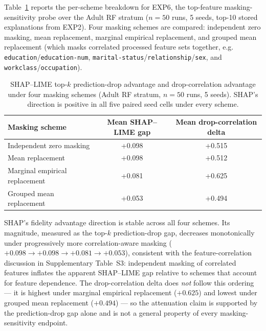 \documentclass[10pt]{article}
\begin{document}
Table~\ref{tab:s6_exp6} reports the per-scheme breakdown for EXP6, the
top-feature masking-sensitivity probe over the Adult RF stratum ($n=50$
runs, 5 seeds, top-10 stored explanations from EXP2). Four masking
schemes are compared: independent zero masking, mean replacement,
marginal empirical replacement, and grouped mean replacement (which masks
correlated processed feature sets together, e.g.
\texttt{education}/\texttt{education-num},
\texttt{marital-status}/\texttt{relationship}/\texttt{sex}, and
\texttt{workclass}/\texttt{occupation}).

\begin{table}[h]
\centering
\caption{SHAP--LIME top-$k$ prediction-drop advantage and drop-correlation
advantage under four masking schemes (Adult RF stratum, $n=50$ runs, 5
seeds). SHAP's direction is positive in all five paired seed cells under
every scheme.}
\label{tab:s6_exp6}
\begin{tabular}{lcc}
\toprule
Masking scheme & Mean SHAP--LIME gap & Mean drop-correlation delta \\
\midrule
Independent zero masking      & +0.098 & +0.515 \\
Mean replacement               & +0.098 & +0.512 \\
Marginal empirical replacement & +0.081 & +0.625 \\
Grouped mean replacement       & +0.053 & +0.494 \\
\bottomrule
\end{tabular}
\end{table}

\noindent SHAP's fidelity advantage direction is stable across all four
schemes. Its magnitude, measured as the top-$k$ prediction-drop gap,
decreases monotonically under progressively more correlation-aware
masking ($+0.098 \rightarrow +0.098 \rightarrow +0.081 \rightarrow
+0.053$), consistent with the feature-correlation discussion in
Supplementary Table~S3: independent masking of correlated features
inflates the apparent SHAP--LIME gap relative to schemes that account for
feature dependence. The drop-correlation delta does \emph{not} follow this
ordering --- it is highest under marginal empirical replacement
($+0.625$) and lowest under grouped mean replacement ($+0.494$) --- so the
attenuation claim is supported by the prediction-drop gap alone and is not
a general property of every masking-sensitivity endpoint.
\end{document}
